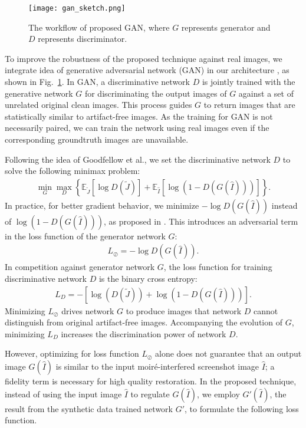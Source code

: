 \documentclass[10pt,twocolumn,letterpaper]{article}
\begin{document}
\begin{figure}
  \centering
  \texttt{[image: gan\_sketch.png]}
  \caption{The workflow of proposed GAN, where $G$ represents
    generator and $D$ represents discriminator.}
  \label{fig:gan_sketch}
\end{figure}

To improve the robustness of the proposed technique against real
images, we integrate idea of generative adversarial network (GAN) in
our architecture \cite{goodfellow2014generative}, as shown in
Fig.~\ref{fig:gan_sketch}.  In GAN, a discriminative network $D$ is
jointly trained with the generative network $G$ for discriminating the
output images of $G$ against a set of unrelated original clean images.
This process guides $G$ to return images that are statistically
similar to artifact-free images.  As the training for GAN is not
necessarily paired, we can train the network using real images even if
the corresponding groundtruth images are unavailable.

Following the idea of Goodfellow et al., we set the discriminative
network $D$ to solve the following minimax problem:
\begin{align}
  \min_G \max_D \left\{ \mathbb{E}_{\tilde{J}} \left[ \log D(\tilde{J}) \right] +
    \mathbb{E}_{\hat{I}} \left[ \log(1-D(G(\hat{I}))) \right] \right\}.
\end{align}
In practice, for better gradient behavior, we minimize $-\log
D(G(\hat{I}))$ instead of $\log(1-D(G(\hat{I})))$, as proposed in
\cite{goodfellow2014generative}.  This introduces an adversarial term
in the loss function of the generator network $G$:
\begin{align}
  L_\oslash = -\log D(G(\hat{I})) .
\end{align}
In competition against generator network $G$, the loss function for
training discriminative network $D$ is the binary cross entropy:
\begin{align}
  L_D = - \left[ \log(D(\tilde{J}))+\log(1-D(G(\hat{I}))) \right].
\label{loss_D}
\end{align}
Minimizing $L_\oslash$ drives network $G$ to produce images that
network $D$ cannot distinguish from original artifact-free images.
Accompanying the evolution of $G$, minimizing $L_D$ increases the
discrimination power of network $D$.

However, optimizing for loss function $L_\oslash$ alone does not
guarantee that an output image $G(\hat{I})$ is similar to the input
moir\'e-interfered screenshot image $\hat{I}$; a fidelity term is
necessary for high quality restoration.  In the proposed technique,
instead of using the input image $\hat{I}$ to regulate $G(\hat{I})$,
we employ $G'(\hat{I})$, the result from the synthetic data trained
network $G'$, to formulate the following loss function.
\end{document}
